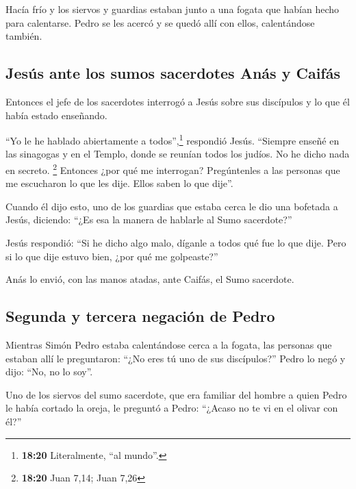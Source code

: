  Hacía frío y los siervos y guardias estaban junto a una
fogata que habían hecho para calentarse. Pedro se les acercó y se quedó
allí con ellos, calentándose también.

\hypertarget{jesuxfas-ante-los-sumos-sacerdotes-anuxe1s-y-caifuxe1s}{%
\subsection{Jesús ante los sumos sacerdotes Anás y
Caifás}\label{jesuxfas-ante-los-sumos-sacerdotes-anuxe1s-y-caifuxe1s}}

 Entonces el jefe de los sacerdotes interrogó a Jesús
sobre sus discípulos y lo que él había estado enseñando.

 ``Yo le he hablado abiertamente a todos'',\footnote{\textbf{18:20}
  Literalmente, ``al mundo''.} respondió Jesús. ``Siempre enseñé en las
sinagogas y en el Templo, donde se reunían todos los judíos. No he dicho
nada en secreto. \footnote{\textbf{18:20} Juan 7,14; Juan 7,26}
 Entonces ¿por qué me interrogan? Pregúntenles a las
personas que me escucharon lo que les dije. Ellos saben lo que dije''.

 Cuando él dijo esto, uno de los guardias que estaba
cerca le dio una bofetada a Jesús, diciendo: ``¿Es esa la manera de
hablarle al Sumo sacerdote?''

 Jesús respondió: ``Si he dicho algo malo, díganle a
todos qué fue lo que dije. Pero si lo que dije estuvo bien, ¿por qué me
golpeaste?''

 Anás lo envió, con las manos atadas, ante Caifás, el
Sumo sacerdote.

\hypertarget{segunda-y-tercera-negaciuxf3n-de-pedro}{%
\subsection{Segunda y tercera negación de
Pedro}\label{segunda-y-tercera-negaciuxf3n-de-pedro}}

 Mientras Simón Pedro estaba calentándose cerca a la
fogata, las personas que estaban allí le preguntaron: ``¿No eres tú uno
de sus discípulos?'' Pedro lo negó y dijo: ``No, no lo soy''.

 Uno de los siervos del sumo sacerdote, que era familiar
del hombre a quien Pedro le había cortado la oreja, le preguntó a Pedro:
``¿Acaso no te vi en el olivar con él?''

